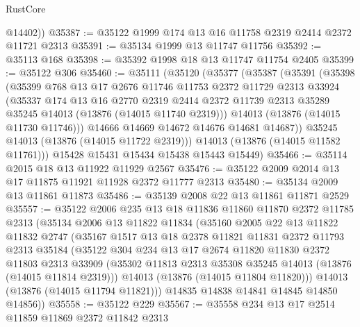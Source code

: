 \begin{lexlean}{RustCore}
\begin{coremodule}
        @14402))
@35387 := @35122 @1999 @174 @13 @16 @11758 @2319 @2414 @2372 @11721 @2313
@35391 := @35134 @1999 @13 @11747 @11756
@35392 := @35113 @168
@35398 := @35392 @1998 @18 @13 @11747 @11754 @2405
@35399 := @35122 @306
@35460 := @35111
    (@35120
      (@35377
        (@35387
          (@35391
            (@35398
              (@35399
                @768
                @13
                @17
                @2676
                @11746
                @11753
                @2372
                @11729
                @2313
                @33924
                (@35337
                  @174
                  @13
                  @16
                  @2770
                  @2319
                  @2414
                  @2372
                  @11739
                  @2313
                  @35289
                  @35245
                  @14013
                  (@13876 (@14015 @11740 @2319)))
                @14013
                (@13876 (@14015 @11730 @11746)))
              @14666
              @14669
              @14672
              @14676
              @14681
              @14687))
          @35245
          @14013
          (@13876 (@14015 @11722 @2319)))
        @14013
        (@13876 (@14015 @11582 @11761)))
      @15428
      @15431
      @15434
      @15438
      @15443
      @15449)
@35466 := @35114 @2015 @18 @13 @11922 @11929 @2567
@35476 := @35122 @2009 @2014 @13 @17 @11875 @11921 @11928 @2372 @11777 @2313
@35480 := @35134 @2009 @13 @11861 @11873
@35486 := @35139 @2008 @22 @13 @11861 @11871 @2529
@35557 := @35122
    @2006
    @235
    @13
    @18
    @11836
    @11860
    @11870
    @2372
    @11785
    @2313
    (@35134
      @2006
      @13
      @11822
      @11834
      (@35160
        @2005
        @22
        @13
        @11822
        @11832
        @2747
        (@35167
          @1517
          @13
          @18
          @2378
          @11821
          @11831
          @2372
          @11793
          @2313
          @35184
          (@35122
            @304
            @234
            @13
            @17
            @2674
            @11820
            @11830
            @2372
            @11803
            @2313
            @33909
            (@35302 @11813 @2313 @35308 @35245 @14013 (@13876 (@14015 @11814 @2319)))
            @14013
            (@13876 (@14015 @11804 @11820)))
          @14013
          (@13876 (@14015 @11794 @11821)))
        @14835
        @14838
        @14841
        @14845
        @14850
        @14856))
@35558 := @35122 @229
@35567 := @35558 @234 @13 @17 @2514 @11859 @11869 @2372 @11842 @2313

\end{coremodule}
\end{lexlean}
